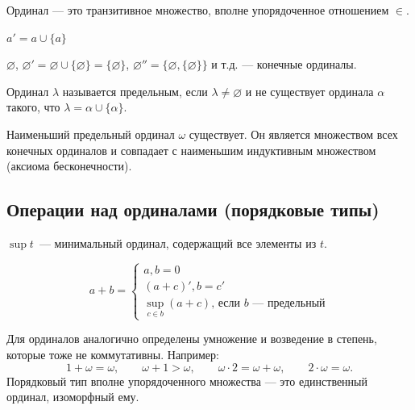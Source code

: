 \documentclass[10pt]{article}
\begin{document}
\begin{definition}[Ординал]
Ординал — это транзитивное множество, вполне упорядоченное отношением $\in$.
\end{definition}

\begin{definition}
    $a' = a \cup \{a\}$
\end{definition}

\begin{example}
$\varnothing$, $\varnothing' = \varnothing \cup \{\varnothing\} = \{\varnothing\}$, $\varnothing'' = \{\varnothing, \{\varnothing\}\}$ и т.д. — конечные ординалы.
\end{example}

\begin{definition}
Ординал $\lambda$ называется предельным, если $\lambda \ne \varnothing$ и не существует ординала $\alpha$ такого, что $\lambda = \alpha \cup \{\alpha\}$.
\end{definition}

\begin{theorem}
Наименьший предельный ординал $\omega$ существует. Он является множеством всех конечных ординалов и совпадает с наименьшим индуктивным множеством (аксиома бесконечности).
\end{theorem}

\subsection{Операции над ординалами (порядковые типы)}
\begin{definition} $\sup t$~--- минимальный ординал, содержащий все элементы из $t$.
\end{definition}
\begin{definition}
    $$
    a + b = \begin{cases}
        a, b = 0\\
        (a+c)', b = c'\\
        \sup_{c\in b}(a + c)\text{, если $b$~--- предельный}
    \end{cases}
    $$
\end{definition}
Для ординалов аналогично определены умножение и возведение в степень, которые тоже не коммутативны. Например:
$$ 1 + \omega = \omega, \qquad \omega + 1 > \omega, \qquad \omega \cdot 2 = \omega + \omega, \qquad 2 \cdot \omega = \omega. $$
Порядковый тип вполне упорядоченного множества — это единственный ординал, изоморфный ему.
\end{document}
